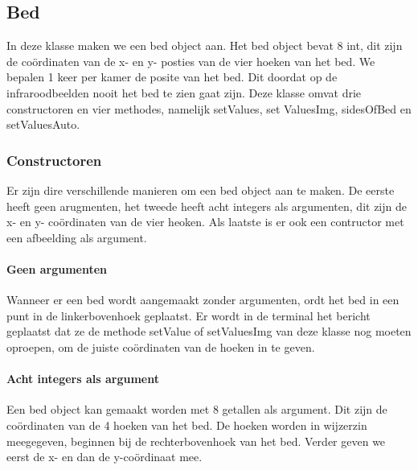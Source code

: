 \subsection{Bed}
\label{mRefBed}
In deze klasse maken we een bed object aan. Het bed object bevat 8 int, dit zijn de co\"ordinaten van de x- en y- posties van de vier hoeken van het bed. We bepalen 1 keer per kamer de posite van het bed. Dit doordat op de infraroodbeelden nooit het bed te zien gaat zijn. Deze klasse omvat drie constructoren en vier methodes, namelijk setValues, set ValuesImg, sidesOfBed en setValuesAuto.

\subsubsection{Constructoren}
Er zijn dire verschillende manieren om een bed object aan te maken. De eerste heeft geen arugmenten, het tweede heeft acht integers als argumenten, dit zijn de x- en y- co\"ordinaten van de vier heoken. Als laatste is er ook een contructor met een afbeelding als argument. 

\paragraph{Geen argumenten}
Wanneer er een bed wordt aangemaakt zonder argumenten, ordt het bed in een punt in de linkerbovenhoek geplaatst. Er wordt in de terminal het bericht geplaatst dat ze de methode setValue of setValuesImg van deze klasse nog moeten oproepen, om de juiste co\"ordinaten van de hoeken in te geven. 

\paragraph{Acht integers als argument}
Een bed object kan gemaakt worden met 8 getallen als argument. Dit zijn de co\"ordinaten van de 4 hoeken van het bed. De hoeken worden in wijzerzin meegegeven, beginnen bij de rechterbovenhoek van het bed. Verder geven we eerst de x- en dan de y-co\"ordinaat mee.

